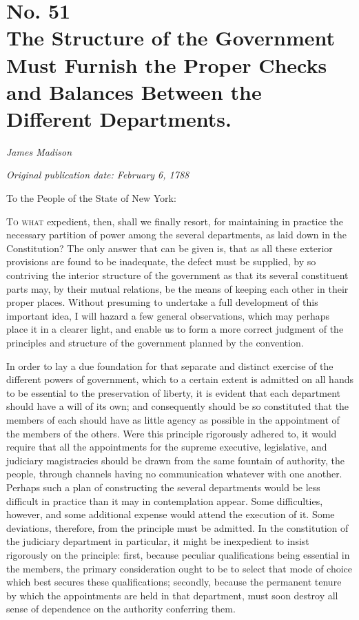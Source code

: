 \chapter[No. 51: The Structure of the Government Must Furnish the Proper Checks and Balances Between the Different Departments.]{No. 51\\ {\small The Structure of the Government Must Furnish the Proper Checks and Balances Between the Different Departments.}}

\textit{James Madison}

\textit{Original publication date: February 6, 1788}
\vspace{1cm}

To the People of the State of New York:
\vspace{.4cm}

\textsc{To what} expedient, then, shall we finally resort, for maintaining in practice the necessary partition of power among the several departments, as laid down in the Constitution? 
The only answer that can be given is, that as all these exterior provisions are found to be inadequate, the defect must be supplied, by so contriving the interior structure of the government as that its several constituent parts may, by their mutual relations, be the means of keeping each other in their proper places. 
Without presuming to undertake a full development of this important idea, I will hazard a few general observations, which may perhaps place it in a clearer light, and enable us to form a more correct judgment of the principles and structure of the government planned by the convention.

In order to lay a due foundation for that separate and distinct exercise of the different powers of government, which to a certain extent is admitted on all hands to be essential to the preservation of liberty, it is evident that each department should have a will of its own; and consequently should be so constituted that the members of each should have as little agency as possible in the appointment of the members of the others. 
Were this principle rigorously adhered to, it would require that all the appointments for the supreme executive, legislative, and judiciary magistracies should be drawn from the same fountain of authority, the people, through channels having no communication whatever with one another. 
Perhaps such a plan of constructing the several departments would be less difficult in practice than it may in contemplation appear. 
Some difficulties, however, and some additional expense would attend the execution of it. 
Some deviations, therefore, from the principle must be admitted. 
In the constitution of the judiciary department in particular, it might be inexpedient to insist rigorously on the principle: first, because peculiar qualifications being essential in the members, the primary consideration ought to be to select that mode of choice which best secures these qualifications; secondly, because the permanent tenure by which the appointments are held in that department, must soon destroy all sense of dependence on the authority conferring them.

